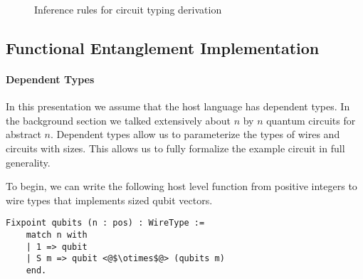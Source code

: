 \begin{figure}[t]
{}
    \caption{Inference rules for circuit typing derivation}
    \label{fig:circuit_typ_der}
\end{figure}

\subsection{Functional Entanglement Implementation}

\paragraph{Dependent Types}
In this presentation we assume that the host language has dependent types.
In the background section we talked extensively about $n$ by $n$ quantum circuits for abstract $n$.
Dependent types allow us to parameterize the types of wires and circuits with sizes.
This allows us to fully formalize the example circuit in full generality.

To begin, we can write the following host level function from positive integers to wire types that implements sized qubit vectors.
\begin{lstlisting}[style=customcoq]
Fixpoint qubits (n : pos) : WireType :=
    match n with
    | 1 => qubit
    | S m => qubit <@$\otimes$@> (qubits m)
    end. 
\end{lstlisting}

